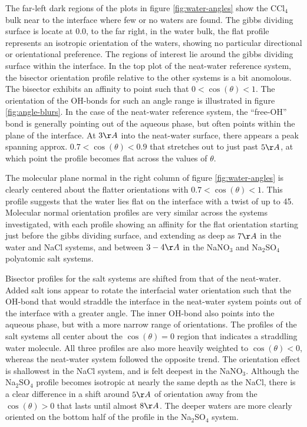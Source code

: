 The far-left dark regions of the plots in figure \ref{fig:water-angles} show the CCl$_4$ bulk near to the interface where few or no waters are found. The gibbs dividing surface is locate at 0.0, to the far right, in the water bulk, the flat profile represents an isotropic orientation of the waters, showing no particular directional or orientational preference. The regions of interest lie around the gibbs dividing surface within the interface. In the top plot of the neat-water reference system, the bisector orientation profile relative to the other systems is a bit anomolous. The bisector exhibits an affinity to point such that $0<\cos(\theta)<1$. The orientation of the OH-bonds for such an angle range is illustrated in figure \ref{fig:angle-blurs}. In the case of the neat-water reference system, the ``free-OH'' bond is generally pointing out of the aqueous phase, but often points within the plane of the interface. At $3\AA$ into the neat-water surface, there appears a peak spanning approx. $0.7<\cos(\theta)<0.9$ that stretches out to just past $5\AA$, at which point the profile becomes flat across the values of $\theta$.

The molecular plane normal in the right column of figure \ref{fig:water-angles} is clearly centered about the flatter orientations with $0.7<\cos(\theta)<1$. This profile suggests that the water lies flat on the interface with a twist of up to 45\degree.  Molecular normal orientation profiles are very similar across the systems investigated, with each profile showing an affinity for the flat orientation starting just before the gibbs dividing surface, and extending as deep as $7\AA$ in the water and NaCl systems, and between $3-4\AA$ in the NaNO$_3$ and Na$_2$SO$_4$ polyatomic salt systems.

Bisector profiles for the salt systems are shifted from that of the neat-water. Added salt ions appear to rotate the interfacial water orientation such that the OH-bond that would straddle the interface in the neat-water system points out of the interface with a greater angle. The inner OH-bond also points into the aqueous phase, but with a more narrow range of orientations. The profiles of the salt systems all center about the $\cos(\theta)=0$ region that indicates a straddling water molecule. All three profiles are also more heavily weighted to $\cos(\theta)<0$, whereas the neat-water system followed the opposite trend. The orientation effect is shallowest in the NaCl system, and is felt deepest in the NaNO$_3$. Although the Na$_2$SO$_4$ profile becomes isotropic at nearly the same depth as the NaCl, there is a clear difference in a shift around $5\AA$ of orientation away from the $\cos(\theta)>0$ that lasts until almost $8\AA$. The deeper waters are more clearly oriented on the bottom half of the profile in the Na$_2$SO$_4$ system.

